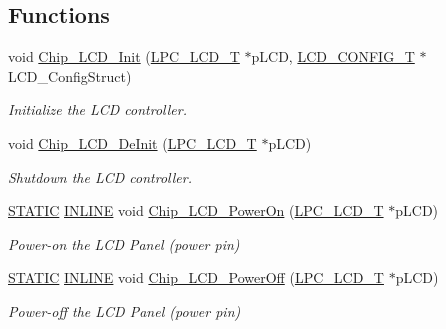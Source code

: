 \subsection*{Functions}
\begin{DoxyCompactItemize}
\item 
void \hyperlink{group___l_c_d__18_x_x__43_x_x_ga1674713116e590f51d61ea5d69d58314}{Chip\+\_\+\+L\+C\+D\+\_\+\+Init} (\hyperlink{struct_l_p_c___l_c_d___t}{L\+P\+C\+\_\+\+L\+C\+D\+\_\+T} $\ast$p\+L\+CD, \hyperlink{struct_l_c_d___c_o_n_f_i_g___t}{L\+C\+D\+\_\+\+C\+O\+N\+F\+I\+G\+\_\+T} $\ast$L\+C\+D\+\_\+\+Config\+Struct)
\begin{DoxyCompactList}\small\item\em Initialize the L\+CD controller. \end{DoxyCompactList}\item 
void \hyperlink{group___l_c_d__18_x_x__43_x_x_ga5f0cb4fb4a8dbd4544ec3686fede73a5}{Chip\+\_\+\+L\+C\+D\+\_\+\+De\+Init} (\hyperlink{struct_l_p_c___l_c_d___t}{L\+P\+C\+\_\+\+L\+C\+D\+\_\+T} $\ast$p\+L\+CD)
\begin{DoxyCompactList}\small\item\em Shutdown the L\+CD controller. \end{DoxyCompactList}\item 
\hyperlink{group___l_p_c___types___public___macros_ga10b2d890d871e1489bb02b7e70d9bdfb}{S\+T\+A\+T\+IC} \hyperlink{spifi__18xx__43xx_8h_a2eb6f9e0395b47b8d5e3eeae4fe0c116}{I\+N\+L\+I\+NE} void \hyperlink{group___l_c_d__18_x_x__43_x_x_ga06f07608827fe9ee120be6540922d16e}{Chip\+\_\+\+L\+C\+D\+\_\+\+Power\+On} (\hyperlink{struct_l_p_c___l_c_d___t}{L\+P\+C\+\_\+\+L\+C\+D\+\_\+T} $\ast$p\+L\+CD)
\begin{DoxyCompactList}\small\item\em Power-\/on the L\+CD Panel (power pin) \end{DoxyCompactList}\item 
\hyperlink{group___l_p_c___types___public___macros_ga10b2d890d871e1489bb02b7e70d9bdfb}{S\+T\+A\+T\+IC} \hyperlink{spifi__18xx__43xx_8h_a2eb6f9e0395b47b8d5e3eeae4fe0c116}{I\+N\+L\+I\+NE} void \hyperlink{group___l_c_d__18_x_x__43_x_x_ga993223c458c548b5e05705a9a5895228}{Chip\+\_\+\+L\+C\+D\+\_\+\+Power\+Off} (\hyperlink{struct_l_p_c___l_c_d___t}{L\+P\+C\+\_\+\+L\+C\+D\+\_\+T} $\ast$p\+L\+CD)
\begin{DoxyCompactList}\small\item\em Power-\/off the L\+CD Panel (power pin) \end{DoxyCompactList}\item 

\end{DoxyCompactItemize}
